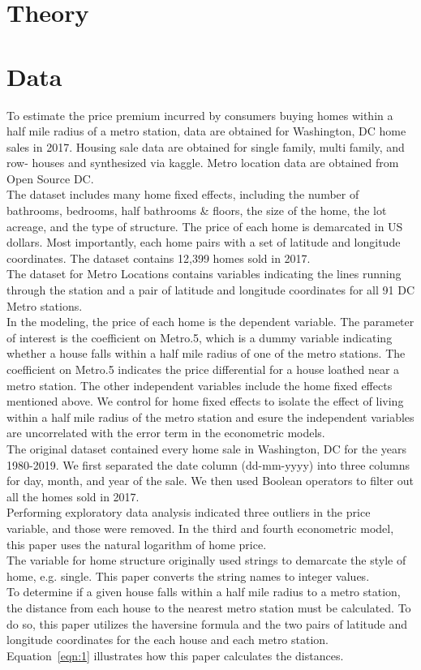 \documentclass[12pt]{report}
\newcommand\tab[1][.50cm]{\hspace*{#1}}
\begin{document}
\section*{Theory}


\section*{Data}

To estimate the price premium incurred by consumers buying homes within a half mile radius of a metro station, data are obtained for Washington, DC home sales in 2017. Housing sale data are obtained for single family, multi family, and row- houses and synthesized via kaggle. Metro location data are obtained from Open Source DC. \\
\tab The dataset includes many home fixed effects, including the number of bathrooms, bedrooms, half bathrooms \& floors, the size of the home, the lot acreage, and the type of structure. The price of each home is demarcated in US dollars. Most importantly, each home pairs with a set of latitude and longitude coordinates. The dataset contains 12,399 homes sold in 2017. \\
\tab The dataset for Metro Locations contains variables indicating the lines running through the station and a pair of latitude and longitude coordinates for all 91 DC Metro stations.\\
\tab In the modeling, the price of each home is the dependent variable. The parameter of interest is the coefficient on Metro.5, which is a dummy variable indicating whether a house falls within a half mile radius of one of the metro stations. The coefficient on Metro.5 indicates the price differential for a house loathed near a metro station. The other independent variables include the home fixed effects mentioned above. We control for home fixed effects to isolate the effect of living within a half mile radius of the metro station and esure the independent variables are uncorrelated with the error term in the econometric models.\\
\tab The original dataset contained every home sale in Washington, DC for the years 1980-2019. We first separated the date column (dd-mm-yyyy) into three columns for day, month, and year of the sale. We then used Boolean operators to filter out all the homes sold in 2017.\\
\tab Performing exploratory data analysis indicated three outliers in the price variable, and those were removed. In the third and fourth econometric model, this paper uses the natural logarithm of home price. \\
\tab The variable for home structure originally used strings to demarcate the style of home, e.g. single. This paper converts the string names to integer values.\\
\tab To determine if a given house falls within a half mile radius to a metro station, the distance from each house to the nearest metro station must be calculated. To do so, this paper utilizes the haversine formula and the two pairs of latitude and longitude coordinates for the each house and each metro station. Equation~\ref{eqn:1} illustrates how this paper calculates the distances.
\end{document}
